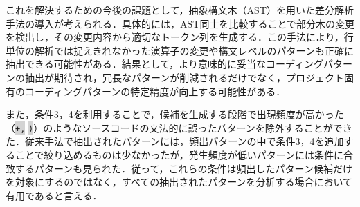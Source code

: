 \documentclass[submit,techrep,noauthor]{ipsj}
\newcommand{\todo}[1]{\colorbox{yellow}{{\bf TODO}:}{\color{red} {\textbf{[#1]}}}}
\begin{document}
これを解決するための今後の課題として，抽象構文木（AST）を用いた差分解析手法の導入が考えられる．具体的には，AST同士を比較することで部分木の変更を検出し，その変更内容から適切なトークン列を生成する．この手法により，行単位の解析では捉えきれなかった演算子の変更や構文レベルのパターンも正確に抽出できる可能性がある．結果として，より意味的に妥当なコーディングパターンの抽出が期待され，冗長なパターンが削減されるだけでなく，プロジェクト固有のコーディングパターンの特定精度が向上する可能性がある．

また，条件3，4を利用することで，候補を生成する段階で出現頻度が高かった（\colorbox{lightgray}{\texttt{+,}} \colorbox{lightgray}{\texttt{)}}）のようなソースコードの文法的に誤ったパターンを除外することができた．従来手法で抽出されたパターンには，頻出パターンの中で条件3，4を追加することで絞り込めるものは少なかったが，発生頻度が低いパターンには条件に合致するパターンも見られた．従って，これらの条件は頻出したパターン候補だけを対象にするのではなく，すべての抽出されたパターンを分析する場合において有用であると言える．


\end{document}

